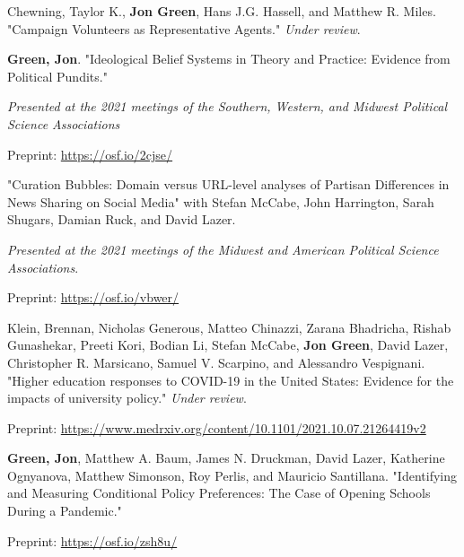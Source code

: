\documentclass[letterpaper]{article}
\renewenvironment{itemize}{
  \begin{list}{}{
    \setlength{\leftmargin}{1.5em}
  }
}{
  \end{list}
}
\begin{document}
\begin{itemize}
\item Chewning, Taylor K., \textbf{Jon Green}, Hans J.G. Hassell, and Matthew R. Miles. "Campaign Volunteers as Representative Agents." \textit{Under review}.

\item \textbf{Green, Jon}. "Ideological Belief Systems in Theory and Practice: Evidence from Political Pundits."
\begin{itemize}
\item \textit{Presented at the 2021 meetings of the Southern, Western, and Midwest Political Science Associations}
\item Preprint: \url{https://osf.io/2cjse/}
\end{itemize}

\item "Curation Bubbles: Domain versus URL-level analyses of Partisan Differences in News Sharing on Social Media" with Stefan McCabe, John Harrington, Sarah Shugars, Damian Ruck, and David Lazer.
\begin{itemize}
\item \textit{Presented at the 2021 meetings of the Midwest and American Political Science Associations}.
\item Preprint: \url{https://osf.io/vbwer/}
\end{itemize} 

\item Klein, Brennan, Nicholas Generous, Matteo Chinazzi, Zarana Bhadricha, Rishab Gunashekar, Preeti Kori, Bodian Li, Stefan McCabe, \textbf{Jon Green}, David Lazer, Christopher R. Marsicano, Samuel V. Scarpino, and Alessandro Vespignani. "Higher education responses to COVID-19 in the United States: Evidence for the impacts of university policy." \textit{Under review}.
\begin{itemize}
\item Preprint: \url{https://www.medrxiv.org/content/10.1101/2021.10.07.21264419v2}
\end{itemize}

\item  \textbf{Green, Jon}, Matthew A. Baum, James N. Druckman, David Lazer, Katherine Ognyanova, Matthew Simonson, Roy Perlis, and Mauricio Santillana. "Identifying and Measuring Conditional Policy Preferences: The Case of Opening Schools During a Pandemic." 
\begin{itemize}
\item Preprint: \url{https://osf.io/zsh8u/}
\end{itemize}


\end{itemize}
\end{document}
